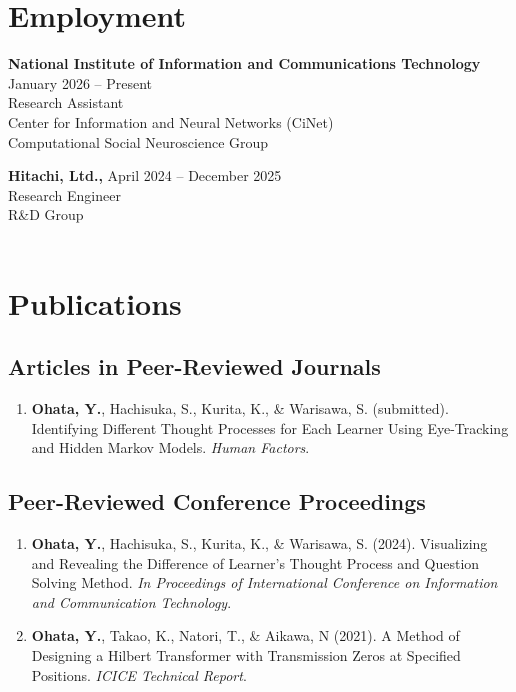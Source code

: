 \documentclass[letterpaper,10.5pt]{article}
\begin{document}
\section*{Employment}
\textbf{National Institute of Information and Communications Technology} \hfill January 2026 -- Present \\
Research Assistant \\
Center for Information and Neural Networks (CiNet) \\
Computational Social Neuroscience Group \\
\par\vspace{3pt}
\textbf{Hitachi, Ltd.,} \hfill April 2024 -- December 2025 \\
Research Engineer \\
R\&D Group \\
 \\
\par\vspace{3pt}
\section*{Publications}
\subsection*{Articles in Peer-Reviewed Journals}
\begin{enumerate}[label=\textbf{J\arabic*}, leftmargin=35pt]
  \item \textbf{Ohata, Y.}, Hachisuka, S., Kurita, K., \& Warisawa, S. (submitted). Identifying Different Thought Processes for Each Learner Using Eye-Tracking and Hidden Markov Models. \textit{Human Factors}.
\end{enumerate}\vspace{2pt}
\subsection*{Peer-Reviewed Conference Proceedings}
\begin{enumerate}[label=\textbf{C\arabic*}, leftmargin=35pt]
  \item \textbf{Ohata, Y.}, Hachisuka, S., Kurita, K., \& Warisawa, S. (2024). Visualizing and Revealing the Difference of Learner's Thought Process and Question Solving Method. \textit{In Proceedings of International Conference on Information and Communication Technology}.
  \item \textbf{Ohata, Y.}, Takao, K., Natori, T., \& Aikawa, N (2021). A Method of Designing a Hilbert Transformer with Transmission Zeros at Specified Positions. \textit{ICICE Technical Report}.
\end{enumerate}\vspace{2pt}
\end{document}
